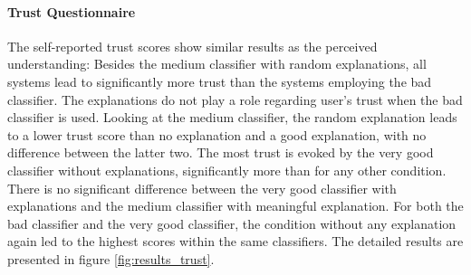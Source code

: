 \paragraph{Trust Questionnaire}
The self-reported trust scores show similar results as the perceived understanding: Besides the medium classifier with random explanations, all systems lead to significantly more trust than the systems employing the bad classifier. The explanations do not play a role regarding user's trust when the bad classifier is used. Looking at the medium classifier, the random explanation leads to a lower trust score than no explanation and a good explanation, with no difference between the latter two. The most trust is evoked by the very good classifier without explanations, significantly more than for any other condition. There is no significant difference between the very good classifier with explanations and the medium classifier with meaningful explanation. For both the bad classifier and the very good classifier, the condition without any explanation again led to the highest scores within the same classifiers. The detailed results are presented in figure \ref{fig:results_trust}.

